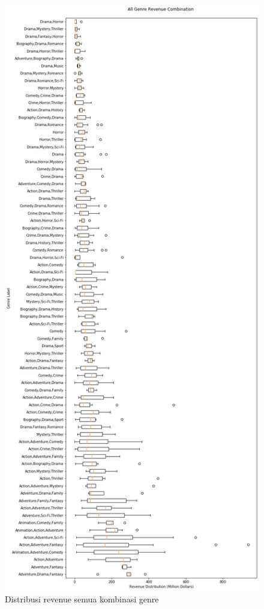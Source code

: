 \begin{figure}[H]
	\centering  
	\includegraphics[scale=0.4]{./Lampiran/gambar/all_genre_multiboxplotbyrevenue}   
	\caption{Distribusi revenue semua kombinasi genre}
	\label{fig:all_genre_multiboxplotbyrevenue} 
\end{figure} 


